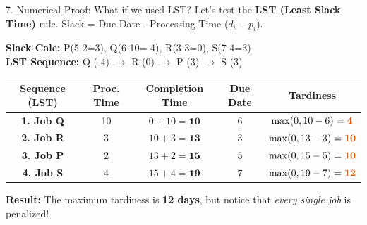 \documentclass[12pt, aspectratio=169]{beamer}
\newcommand{\res}[1]{\textcolor{highlightcol}{\textbf{#1}}}
\begin{document}
\begin{frame}{7. Numerical Proof: What if we used LST?}
    Let's test the \textbf{LST (Least Slack Time)} rule. Slack = Due Date - Processing Time ($d_i - p_i$).
    
    \vspace{0.2cm}
    \textbf{Slack Calc:} P(5-2=3), Q(6-10=-4), R(3-3=0), S(7-4=3) \\
    \textbf{LST Sequence:} Q (-4) $\rightarrow$ R (0) $\rightarrow$ P (3) $\rightarrow$ S (3)
    
    \vspace{0.2cm}
    \begin{center}
    \renewcommand{\arraystretch}{1.2}
    \small
    \begin{tabular}{c c c c c}
        \toprule
        \textbf{Sequence (LST)} & \textbf{Proc. Time} & \textbf{Completion Time} & \textbf{Due Date} & \textbf{Tardiness} \tabularnewline
        \midrule
        \textbf{1. Job Q} & 10 & $0 + 10 = \textbf{10}$ & 6 & $\max(0, 10 - 6) = \res{4}$ \tabularnewline
        \textbf{2. Job R} & 3 & $10 + 3 = \textbf{13}$ & 3 & $\max(0, 13 - 3) = \res{10}$ \tabularnewline
        \textbf{3. Job P} & 2 & $13 + 2 = \textbf{15}$ & 5 & $\max(0, 15 - 5) = \res{10}$ \tabularnewline
        \textbf{4. Job S} & 4 & $15 + 4 = \textbf{19}$ & 7 & $\max(0, 19 - 7) = \res{12}$ \tabularnewline
        \bottomrule
    \end{tabular}
    \end{center}
    
    \vspace{0.2cm}
    \textbf{Result:} The maximum tardiness is \textbf{12 days}, but notice that \textit{every single job} is penalized!
\end{frame}
\end{document}
